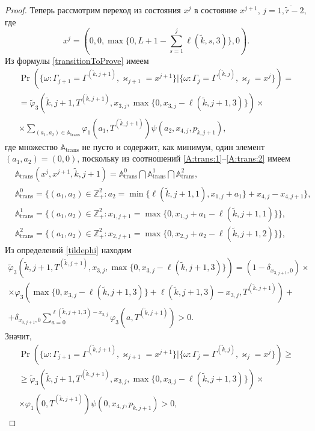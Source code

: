 \documentclass{report}
\begin{document}
\begin{proof}
Теперь рассмотрим переход из состояния $x^j$ в состояние $x^{j+1}$, $j=\overline{1,\tilde{r}-2}$, где
\begin{equation*}
x^j = (0,0,\max{\{0,L+1-\sum_{s=1}^{j} \ell(\tilde{k},s,3)\}},0).
\end{equation*}
Из формулы \eqref{transitionToProve} имеем
\begin{multline*}
\Pr(\{\omega\colon \Gamma_{j+1}=\Gamma^{(\tilde{k},j+1)}, \varkappa_{j+1}=x^{j+1}\}|
\{\omega\colon \Gamma_{j}=\Gamma^{(\tilde{k},j)}, \varkappa_{j}=x^j\})=\\
=\widetilde{\varphi}_3(\tilde{k},j+1,T^{(\tilde{k},j+1)},x_{3,j},\max{\{0,x_{3,j} - \ell(\tilde{k},j+1,3)\}})\times \\
\times
\sum_{(a_1,a_2)\in {\mathbb A}_{\mathrm{trans}}}\varphi_1(a_1,T^{(\tilde{k},j+1)})  \psi(a_2,x_{4,j}, p_{\tilde{k},j+1}),
\end{multline*}
где множество ${\mathbb A}_{\mathrm{trans}}$ не пусто и содержит, как минимум, один элемент $(a_1,a_2)=(0,0)$, поскольку из соотношений \eqref{A:trans:1}--\eqref{A:trans:2} имеем
\begin{align*}
&{\mathbb A}_{\mathrm{trans}}(x^j,x^{j+1},\tilde{k},j+1) = {\mathbb A}_{\mathrm{trans}}^0 \bigcap {\mathbb A}_{\mathrm{trans}}^1\bigcap {\mathbb A}_{\mathrm{trans}}^2,\\
&{\mathbb A}_{\mathrm{trans}}^0 = \{(a_1,a_2) \in \mathbb{Z}_+^2 \colon a_2 = \min{\{\ell(\tilde{k},j+1,1), x_{1,j}+a_1}\} +x_{4,j}- x_{4,j+1}\},\\
&{\mathbb A}_{\mathrm{trans}}^1 = \{(a_1,a_2) \in \mathbb{Z}_+^2 \colon x_{1,j+1}=\max{\{0,x_{1,j}+a_1-\ell(\tilde{k},j+1,1)\}}\},\\
 &{\mathbb A}_{\mathrm{trans}}^2 = \{(a_1,a_2) \in \mathbb{Z}_+^2 \colon  x_{2,j+1} =\max{\{0,x_{2,j}+a_2-\ell(\tilde{k},j+1,2)\}}\},
\end{align*}
Из определений \eqref{tildephi} находим
\begin{multline*}
\widetilde{\varphi}_3(\tilde{k},j+1,T^{(\tilde{k},j+1)},x_{3,j},\max{\{0,x_{3,j} - \ell(\tilde{k},j+1,3)\}})= (1-\delta_{x_{3,j+1},0}) \times \\\times\varphi_3(\max{\{0,x_{3,j} - \ell(\tilde{k},j+1,3)\}} + \ell (\tilde{k},j+1,3) - x_{3,j},T^{(\tilde{k},j+1)} ) 
+\\+\delta_{x_{3,j+1},0} \sum_{a=0}^{\ell(\tilde{k},j+1,3)-x_{3,j}}\varphi_3 (a,T^{(\tilde{k},j+1)})>0.
\end{multline*}
Значит,
\begin{multline*}
\Pr(\{\omega\colon \Gamma_{j+1}=\Gamma^{(\tilde{k},j+1)}, \varkappa_{j+1}=x^{j+1}\}|\{\omega\colon 
\Gamma_{j}=\Gamma^{(\tilde{k},j)}, \varkappa_{j}=x^j\})\geqslant \\
\geqslant \widetilde{\varphi}_3(\tilde{k},j+1,T^{(\tilde{k},j+1)},x_{3,j},\max{\{0,x_{3,j} - \ell(\tilde{k},j+1,3)\}})
\times \\ \times
\varphi_1(0,T^{(\tilde{k},j+1)})  \psi(0,x_{4,j}, p_{\tilde{k},j+1}) > 0,
\end{multline*}


\end{proof}
\end{document}
